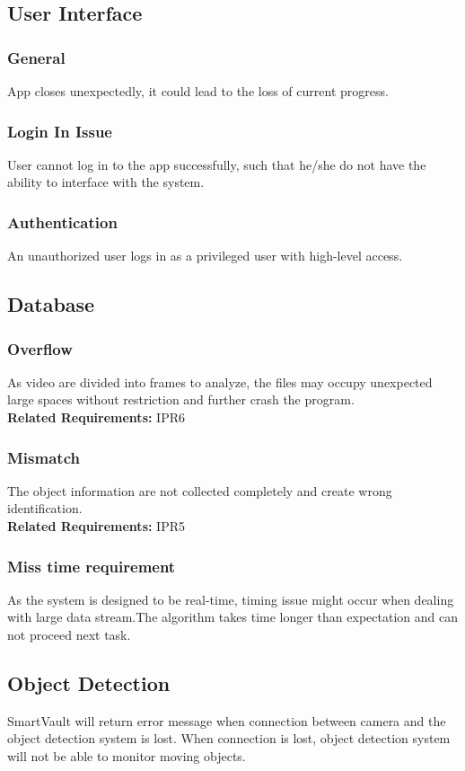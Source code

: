\documentclass{article}
\begin{document}
\subsection{User Interface}
\subsubsection{General}
App closes unexpectedly, it could lead to the loss of current progress.
\subsubsection{Login In Issue}
User cannot log in to the app successfully, such that he/she do not have the ability to interface with the system.
\subsubsection{Authentication}
An unauthorized user logs in as a privileged user with high-level access.
\subsection{Database}
\subsubsection{Overflow}
As video are divided into frames to analyze, the files may occupy unexpected large spaces without restriction and further crash the program.\\
\textbf{Related Requirements: }IPR6
\subsubsection{Mismatch}
The object information are not collected completely and create wrong identification.\\
\textbf{Related Requirements: }IPR5
\subsubsection{Miss time requirement}
As the system is designed to be real-time, timing issue might occur when dealing with large data stream.The algorithm takes time longer than expectation and can not proceed next task.\\
\subsection{Object Detection}
SmartVault will return error message when connection between camera and the object detection system is lost. When connection is lost, object detection system will not be able to monitor moving objects.
\end{document}
